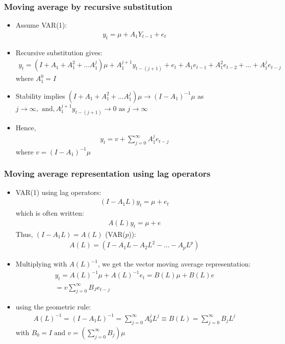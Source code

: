 \documentclass[10pt]{article}
\begin{document}
\subsubsection{Moving average by recursive substitution}
\begin{itemize}
    \item Assume VAR(1): 
    \begin{gather*}
        y_t = \mu + A_1Y_{t - 1} + e_t
    \end{gather*}
    \item Recursive substitution gives: 
    \begin{gather*}
        y_t = \left(I + A_1 + A_1^2 + \dots A_1^j\right)\mu + A_1^{j + 1}y_{t - (j + 1)} + e_t + A_1e_{t - 1} + A_1^2e_{t - 2} + \dots + A_1^je_{t - j}
    \end{gather*}
    where $A_1^0 = I $
    \item Stability implies $\left(I + A_1 + A_1^2 + \dots A_1^j\right)\mu\to(I - A_1)^{-1}\mu $ as $j\to\infty, \text{ and}, A_1^{j + 1}y_{t - (j + 1)}\to 0\text{ as }j\to\infty $
    \item Hence, 
    \begin{gather*}
        y_t = v + \sum_{j = 0}^{\infty}A^j_1e_{t - j}
    \end{gather*}
    where $v = (I - A_1)^{-1}\mu $
\end{itemize}
\subsubsection{Moving average representation using lag operators}
\begin{itemize}
    \item VAR(1) using lag operators: 
    \begin{gather*}
        (I - A_1L)y_t = \mu + e_t
    \end{gather*}
    which is often written: 
    \begin{gather*}
        A(L)y_t = \mu + e
    \end{gather*}
    Thus, $(I - A_1L) = A(L)$ (VAR($p $)):
    \begin{gather*}
        A(L) = (I - A_1L - A_2L^2 - \dots - A_pL^p)
    \end{gather*}
    \item Multiplying with $A(L)^{-1} $, we get the vector moving average representation: 
    \begin{gather*}
        y_t = A(L)^{-1}\mu + A(L)^{-1}e_t = B(L)\mu + B(L)e\\
        = v \sum_{j = 0}^{\infty}B_Je_{t - j}
    \end{gather*}
    \item using the geometric rule: 
    \begin{gather*}
        A(L)^{-1} = (I - A_1L)^{-1} = \sum_{j = 0}^{\infty}A_0^jL^j \equiv B(L) = \sum_{j = 0}^{\infty}B_jL^j
    \end{gather*}
    with $B_0 = I\text{ and }v = \left(\sum_{j = 0}^{\infty}B_j\right)\mu $
\end{itemize}
\newpage 
\end{document}
